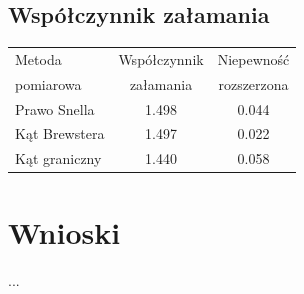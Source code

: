 \documentclass[a4paper,10pt]{article}
\begin{document}
\subsection{Współczynnik załamania}
\begin{tabular}{|l|c|c|}
  \hline
  Metoda & Współczynnik &Niepewność \\
  pomiarowa & załamania & rozszerzona\\\hline
  Prawo Snella & 1.498 & 0.044 \\\hline
  Kąt Brewstera& 1.497 & 0.022 \\\hline
  Kąt graniczny& 1.440 & 0.058 \\\hline
\end{tabular}

\section{Wnioski}
\paragraph{}...
\end{document}

